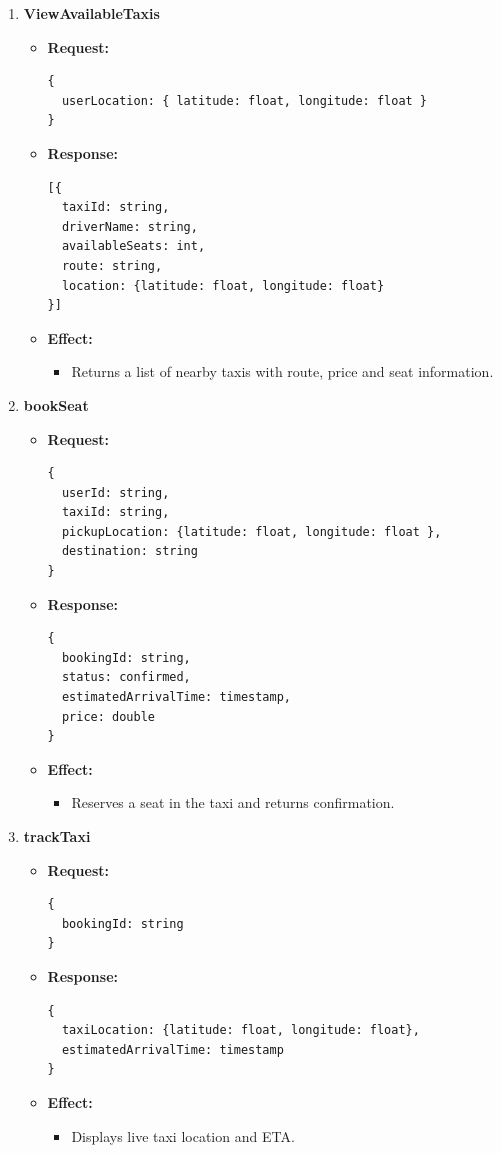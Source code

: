 \documentclass[a4paper,12pt]{article}
\begin{document}
\begin{enumerate}
  \item \textbf{ViewAvailableTaxis}
    \begin{itemize}
      \item \textbf{Request:}
      \begin{verbatim}
{
  userLocation: { latitude: float, longitude: float }
}
      \end{verbatim}
      \item \textbf{Response:}
      \begin{verbatim}
[{
  taxiId: string,
  driverName: string,
  availableSeats: int,
  route: string,
  location: {latitude: float, longitude: float}
}]
      \end{verbatim}
      \item \textbf{Effect:}
      \begin{itemize}
        \item Returns a list of nearby taxis with route, price and seat information.
      \end{itemize}
    \end{itemize}

  \item \textbf{bookSeat}
    \begin{itemize}
      \item \textbf{Request:}
      \begin{verbatim}
{
  userId: string,
  taxiId: string,
  pickupLocation: {latitude: float, longitude: float },
  destination: string
}
      \end{verbatim}
      \item \textbf{Response:}
      \begin{verbatim}
{
  bookingId: string,
  status: confirmed,
  estimatedArrivalTime: timestamp,
  price: double
}
      \end{verbatim}
      \item \textbf{Effect:}
      \begin{itemize}
        \item Reserves a seat in the taxi and returns confirmation.
      \end{itemize}
    \end{itemize}

  \item \textbf{trackTaxi}
    \begin{itemize}
      \item \textbf{Request:}
      \begin{verbatim}
{
  bookingId: string
}
      \end{verbatim}
      \item \textbf{Response:}
      \begin{verbatim}
{
  taxiLocation: {latitude: float, longitude: float},
  estimatedArrivalTime: timestamp
}
      \end{verbatim}
      \item \textbf{Effect:}
      \begin{itemize}
        \item Displays live taxi location and ETA.
      \end{itemize}
    \end{itemize}
\end{enumerate}
\end{document}

